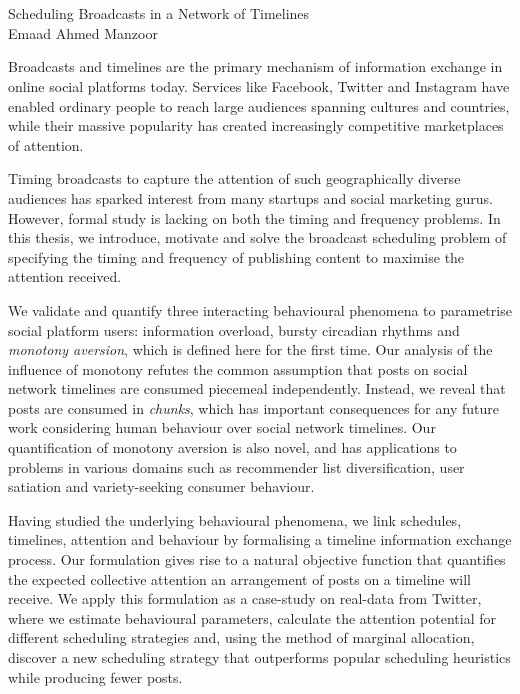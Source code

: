 \documentclass[onecolumn, 12 pt, doublespace, fullpage, letterpaper]{report}
\begin{document}
\chapter*{}

\doublespacing
{}

\begin{center}
\Large{Scheduling Broadcasts in a Network of Timelines\\
Emaad Ahmed Manzoor}
\end{center}

Broadcasts and timelines are the primary mechanism of information exchange in online social platforms today. Services like Facebook, Twitter and Instagram have enabled ordinary people to reach large audiences spanning cultures and countries, while their massive popularity has created increasingly competitive marketplaces of attention.

Timing broadcasts to capture the attention of such geographically diverse audiences has sparked interest from many startups and social marketing gurus. However, formal study is lacking on both the timing and frequency problems. In this thesis, we introduce, motivate and solve the broadcast scheduling problem of specifying the timing and frequency of publishing content to maximise the attention received.

We validate and quantify three interacting behavioural phenomena to parametrise social platform users: information overload, bursty circadian rhythms and \textit{monotony aversion}, which is defined here for the first time. Our analysis of the influence of monotony refutes the common assumption that posts on social network timelines are consumed piecemeal independently. Instead, we reveal that posts are consumed in \textit{chunks}, which has important consequences for any future work considering human behaviour over social network timelines. Our quantification of monotony aversion is also novel, and has applications to problems in various domains such as recommender list diversification, user satiation and variety-seeking consumer behaviour.

Having studied the underlying behavioural phenomena, we link schedules, timelines, attention and behaviour by formalising a timeline information exchange process. Our formulation gives rise to a natural objective function that quantifies the expected collective attention an arrangement of posts on a timeline will receive. We apply this formulation as a case-study on real-data from Twitter, where we estimate behavioural parameters, calculate the attention potential for different scheduling strategies and, using the method of marginal allocation, discover a new scheduling strategy that outperforms popular scheduling heuristics while producing fewer posts.
\end{document}
